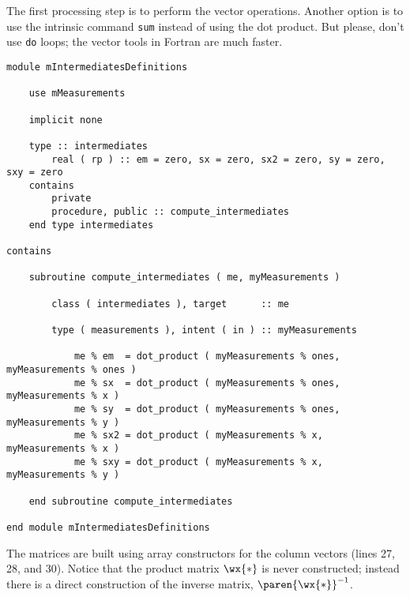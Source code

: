 The first processing step is to perform the vector operations. Another option is to use the intrinsic command \texttt{sum} instead of using the dot product. But please, don't use \texttt{do} loops; the vector tools in Fortran are much faster.
\begin{lstlisting}
module mIntermediatesDefinitions

    use mMeasurements

    implicit none

    type :: intermediates
        real ( rp ) :: em = zero, sx = zero, sx2 = zero, sy = zero, sxy = zero
    contains
        private
        procedure, public :: compute_intermediates
    end type intermediates

contains

    subroutine compute_intermediates ( me, myMeasurements )

        class ( intermediates ), target      :: me

        type ( measurements ), intent ( in ) :: myMeasurements

            me % em  = dot_product ( myMeasurements % ones, myMeasurements % ones )
            me % sx  = dot_product ( myMeasurements % ones, myMeasurements % x )
            me % sy  = dot_product ( myMeasurements % ones, myMeasurements % y )
            me % sx2 = dot_product ( myMeasurements % x,    myMeasurements % x )
            me % sxy = dot_product ( myMeasurements % x,    myMeasurements % y )

    end subroutine compute_intermediates

end module mIntermediatesDefinitions
\end{lstlisting}
The matrices are built using array constructors for the column vectors (lines 27, 28, and 30). Notice that the product matrix $\wx{*}$ is never constructed; instead there is a direct construction of the inverse matrix, $\paren{\wx{*}}^{-1}$.
